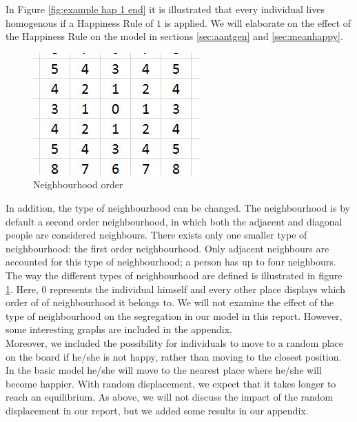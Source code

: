 In Figure \ref{fig:example hap 1 end} it is illustrated that every individual lives homogenous if a Happiness Rule of $1$ is applied.
We will elaborate on the effect of the Happiness Rule on the model in sections \ref{sec:aantgen} and \ref{sec:meanhappy}.\\

\begin{figure}
\vspace{-20pt}
\centering
\includegraphics[scale=0.8]{buurtorde.jpg}
\caption{Neighbourhood order}
\vspace{-10pt}
\label{fig:neighbourhood}
\end{figure}

In addition,  the type of neighbourhood can be changed.
The neighbourhood is  by default a second order neighbourhood, in which both the adjacent and diagonal people are considered neighbours. 
There exists only one smaller type of neighbourhood: the first order neighbourhood. 
Only adjacent neighbours are accounted for this type of neighbourhood; a person has up to four neighbours.
The way the different types of neighbourhood are defined is illustrated in figure \ref{fig:neighbourhood}.
Here, $0$ represents the individual himself and every other place displays which order of  of neighbourhood it belongs to.
We will not examine the effect of the type of neighbourhood on the segregation in our model in this report.
However, some interesting graphs are included in the appendix.\\

Moreover, we included the possibility for individuals to move to a random place on the board if he/she is not happy, rather than moving to the closest position.
In the basic model he/she will move to the nearest place where he/she will become happier. With random displacement, we expect that it takes longer to reach an equilibrium.
As above, we will not discuss the impact of the random displacement in our report, but we added some results in our appendix.\\

